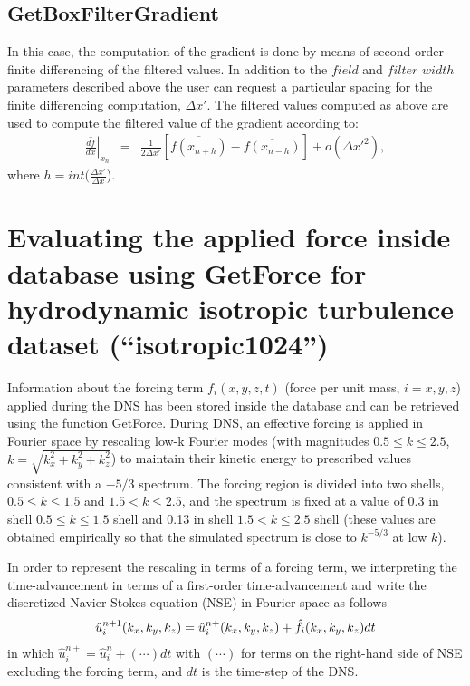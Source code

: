 \documentclass[11pt]{article}
\def\bea{\begin{eqnarray}}
\def\eea{\end{eqnarray}}
\begin{document}
\subsection{GetBoxFilterGradient}
In this case, the computation of the gradient is done by means of second order finite differencing of the filtered values. 
In addition to the $field$ and $filter$ $width$ parameters described above the user can request a particular spacing for 
the finite differencing computation, $\Delta x'$. The filtered values computed as above are used to compute the filtered
value of the gradient according to:
\bea \left.\overline{\frac{df}{dx}}\right|_{x_n}
&=& \frac{1}{2\Delta x'}[\overline{f(x_{n+h})}-\overline{f(x_{n-h})}] +o({\Delta x'}^2), \eea
where $h = int(\frac{\Delta x'}{\Delta x}$).

\section{Evaluating the applied force inside database using GetForce for hydrodynamic isotropic turbulence dataset (``isotropic1024'')}

Information about the forcing term $f_i(x,y,z,t)$ (force per unit mass, $i=x,y,z$) applied during the DNS has been stored inside the database and can be retrieved using the function GetForce. During DNS, an effective forcing is applied in Fourier space by rescaling low-k Fourier modes (with magnitudes $0.5\leq k\leq 2.5$, $k=\sqrt{k_x^2+k_y^2+k_z^2}$) to maintain their kinetic energy to prescribed values consistent with a $-5/3$ spectrum. The forcing region is divided into two shells,
$0.5\leq k\leq 1.5$ and $1.5<k\leq 2.5$, and the spectrum is fixed at a value of $0.3$ in shell $0.5\leq k\leq 1.5$ shell and 0.13 in shell $1.5<k\leq 2.5$ shell (these values are obtained empirically so that the simulated spectrum is close to $k^{-5/3}$ at low $k$).

In order to represent the rescaling in terms of a forcing term, we interpreting the time-advancement in terms of a
first-order time-advancement and write the discretized Navier-Stokes equation (NSE) in Fourier space as follows
\bea
\hat{u}_i^{n+1}(k_x,k_y,k_z) = \hat{u}_i^{n+}(k_x,k_y,k_z)+\hat{f}_i(k_x,k_y,k_z) dt
\label{eq:ui^{n+1}}
\eea
in which $\hat{u}_i^{n+}=\hat{u}_i^n+(\cdots)dt$ with $(\cdots)$ for terms on the right-hand side of NSE excluding the forcing term, and $dt$ is the time-step of the DNS.
\end{document}
